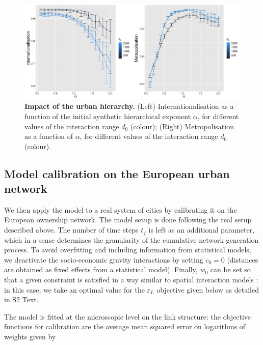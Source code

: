 \documentclass[10pt,letterpaper]{article}
\begin{document}
\begin{figure}
    \begin{center}
        \includegraphics[width=\linewidth]{figures/Fig7.png}
    \end{center}
    \caption{\textbf{Impact of the urban hierarchy.} (Left) Internationalisation as a function of the initial synthetic hierarchical exponent $\alpha$, for different values of the interaction range $d_0$ (colour); (Right) Metropolisation as a function of $\alpha$, for different values of the interaction range $d_0$ (colour).\label{fig:fig7}}
\end{figure}



\subsection*{Model calibration on the European urban network}

We then apply the model to a real system of cities by calibrating it on the European ownership network. The model setup is done following the real setup described above. The number of time steps $t_f$ is left as an additional parameter, which in a sense determines the granularity of the cumulative network generation process. To avoid overfitting and including information from statistical models, we deactivate the socio-economic gravity interactions by setting $c_0 = 0$ (distances are obtained as fixed effects from a statistical model). Finally, $w_0$ can be set so that a given constraint is satisfied in a way similar to spatial interaction models \cite{wilson1975some}: in this case, we take an optimal value for the $\varepsilon_L$ objective given below as detailed in S2 Text.

The model is fitted at the microscopic level on the link structure: the objective functions for calibration are the average mean squared error on logarithms of weights given by
\end{document}
